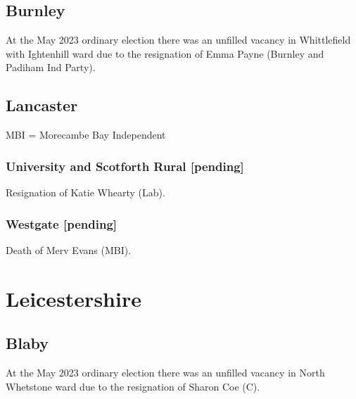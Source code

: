 \documentclass[a4paper,openany]{book}
\begin{document}
\begin{resultsiii}
\subsection*{Burnley}

At the May 2023 ordinary election there was an unfilled vacancy in Whittlefield with Ightenhill ward due to the resignation of Emma Payne (Burnley and Padiham Ind Party).%

\subsection*{Lancaster}

MBI = Morecambe Bay Independent

\subsubsection*{University and Scotforth Rural \hspace*{\fill}\nolinebreak[1]%
	\enspace\hspace*{\fill}
	[pending]}


Resignation of Katie Whearty (Lab).

\subsubsection*{Westgate \hspace*{\fill}\nolinebreak[1]%
	\enspace\hspace*{\fill}
	[pending]}


Death of Merv Evans (MBI).

\section{Leicestershire}

\subsection*{Blaby}

At the May 2023 ordinary election there was an unfilled vacancy in North Whetstone ward due to the resignation of Sharon Coe (C).%


\end{resultsiii}
\end{document}
